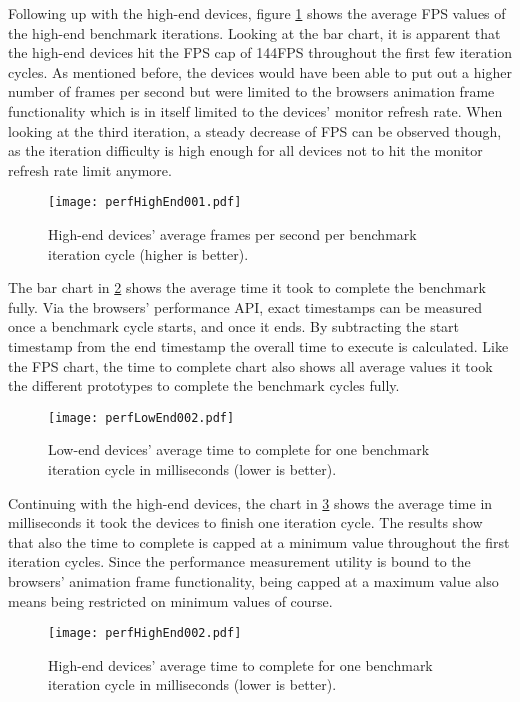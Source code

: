 Following up with the high-end devices, figure \ref{fig:perfHighEnd001} shows the average FPS values of the high-end benchmark iterations. Looking at the bar chart, it is apparent that the high-end devices hit the FPS cap of 144FPS throughout the first few iteration cycles. As mentioned before, the devices would have been able to put out a higher number of frames per second but were limited to the browsers animation frame functionality which is in itself limited to the devices' monitor refresh rate. When looking at the third iteration, a steady decrease of FPS can be observed though, as the iteration difficulty is high enough for all devices not to hit the monitor refresh rate limit anymore.

\begin{figure}
\centering
\texttt{[image: perfHighEnd001.pdf]}
\caption{High-end devices' average frames per second per benchmark iteration cycle (higher is better).}
\label{fig:perfHighEnd001}
\end{figure}

The bar chart in \ref{fig:perfLowEnd002} shows the average time it took to complete the benchmark fully. Via the browsers' performance API, exact timestamps can be measured once a benchmark cycle starts, and once it ends. By subtracting the start timestamp from the end timestamp the overall time to execute is calculated. Like the FPS chart, the time to complete chart also shows all average values it took the different prototypes to complete the benchmark cycles fully.

\begin{figure}
\centering
\texttt{[image: perfLowEnd002.pdf]}
\caption{Low-end devices' average time to complete for one benchmark iteration cycle in milliseconds (lower is better).}
\label{fig:perfLowEnd002}
\end{figure}

Continuing with the high-end devices, the chart in \ref{fig:perfHighEnd002} shows the average time in milliseconds it took the devices to finish one iteration cycle. The results show that also the time to complete is capped at a minimum value throughout the first iteration cycles. Since the performance measurement utility is bound to the browsers' animation frame functionality, being capped at a maximum value also means being restricted on minimum values of course.

\begin{figure}
\centering
\texttt{[image: perfHighEnd002.pdf]}
\caption{High-end devices' average time to complete for one benchmark iteration cycle in milliseconds (lower is better).}
\label{fig:perfHighEnd002}
\end{figure}

